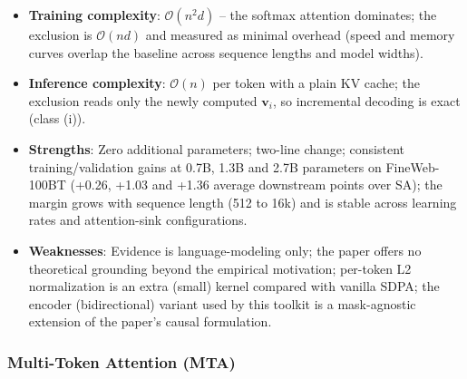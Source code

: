 \begin{itemize}[leftmargin=*]
    \item \textbf{Training complexity}: $\mathcal{O}(n^2 d)$ -- the softmax attention dominates; the exclusion is $\mathcal{O}(nd)$ and measured as minimal overhead (speed and memory curves overlap the baseline across sequence lengths and model widths).
    \item \textbf{Inference complexity}: $\mathcal{O}(n)$ per token with a plain KV cache; the exclusion reads only the newly computed $\mathbf{v}_i$, so incremental decoding is exact (class (i)).
    \item \textbf{Strengths}: Zero additional parameters; two-line change; consistent training/validation gains at 0.7B, 1.3B and 2.7B parameters on FineWeb-100BT (+0.26, +1.03 and +1.36 average downstream points over SA); the margin grows with sequence length (512 to 16k) and is stable across learning rates and attention-sink configurations.
    \item \textbf{Weaknesses}: Evidence is language-modeling only; the paper offers no theoretical grounding beyond the empirical motivation; per-token L2 normalization is an extra (small) kernel compared with vanilla SDPA; the encoder (bidirectional) variant used by this toolkit is a mask-agnostic extension of the paper's causal formulation.
\end{itemize}

\subsubsection{Multi-Token Attention (MTA)}

